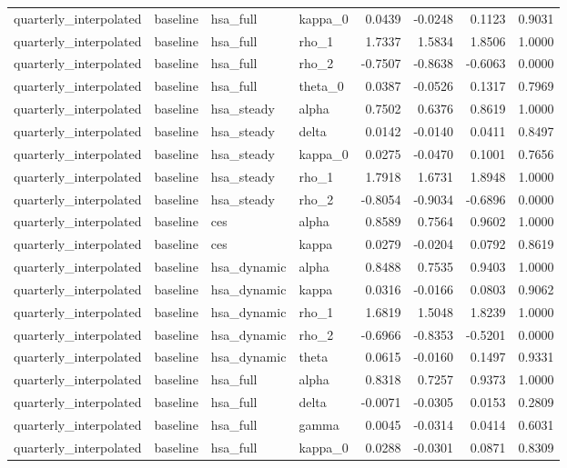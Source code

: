 \begin{tabular}{llllrrrr}
quarterly\_interpolated & baseline & hsa\_full & kappa\_0 & 0.0439 & -0.0248 & 0.1123 & 0.9031 \\
quarterly\_interpolated & baseline & hsa\_full & rho\_1 & 1.7337 & 1.5834 & 1.8506 & 1.0000 \\
quarterly\_interpolated & baseline & hsa\_full & rho\_2 & -0.7507 & -0.8638 & -0.6063 & 0.0000 \\
quarterly\_interpolated & baseline & hsa\_full & theta\_0 & 0.0387 & -0.0526 & 0.1317 & 0.7969 \\
quarterly\_interpolated & baseline & hsa\_steady & alpha & 0.7502 & 0.6376 & 0.8619 & 1.0000 \\
quarterly\_interpolated & baseline & hsa\_steady & delta & 0.0142 & -0.0140 & 0.0411 & 0.8497 \\
quarterly\_interpolated & baseline & hsa\_steady & kappa\_0 & 0.0275 & -0.0470 & 0.1001 & 0.7656 \\
quarterly\_interpolated & baseline & hsa\_steady & rho\_1 & 1.7918 & 1.6731 & 1.8948 & 1.0000 \\
quarterly\_interpolated & baseline & hsa\_steady & rho\_2 & -0.8054 & -0.9034 & -0.6896 & 0.0000 \\
quarterly\_interpolated & baseline & ces & alpha & 0.8589 & 0.7564 & 0.9602 & 1.0000 \\
quarterly\_interpolated & baseline & ces & kappa & 0.0279 & -0.0204 & 0.0792 & 0.8619 \\
quarterly\_interpolated & baseline & hsa\_dynamic & alpha & 0.8488 & 0.7535 & 0.9403 & 1.0000 \\
quarterly\_interpolated & baseline & hsa\_dynamic & kappa & 0.0316 & -0.0166 & 0.0803 & 0.9062 \\
quarterly\_interpolated & baseline & hsa\_dynamic & rho\_1 & 1.6819 & 1.5048 & 1.8239 & 1.0000 \\
quarterly\_interpolated & baseline & hsa\_dynamic & rho\_2 & -0.6966 & -0.8353 & -0.5201 & 0.0000 \\
quarterly\_interpolated & baseline & hsa\_dynamic & theta & 0.0615 & -0.0160 & 0.1497 & 0.9331 \\
quarterly\_interpolated & baseline & hsa\_full & alpha & 0.8318 & 0.7257 & 0.9373 & 1.0000 \\
quarterly\_interpolated & baseline & hsa\_full & delta & -0.0071 & -0.0305 & 0.0153 & 0.2809 \\
quarterly\_interpolated & baseline & hsa\_full & gamma & 0.0045 & -0.0314 & 0.0414 & 0.6031 \\
quarterly\_interpolated & baseline & hsa\_full & kappa\_0 & 0.0288 & -0.0301 & 0.0871 & 0.8309 \\

\end{tabular}
